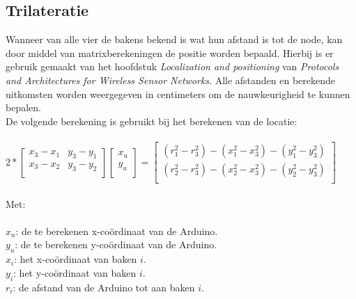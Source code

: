 \documentclass{article}
\begin{document}
\subsection{Trilateratie}
Wanneer van alle vier de bakens bekend is wat hun afstand is tot de node, kan door middel van matrixberekeningen de positie worden bepaald. Hierbij is er gebruik gemaakt van het hoofdstuk \textit{Localization and positioning} van \textit{Protocols and Architectures for Wireless Sensor Networks}\cite{h9}. Alle afstanden en berekende uitkomsten worden weergegeven in centimeters om de nauwkeurigheid te kunnen bepalen. \\
De volgende berekening is gebruikt bij het berekenen van de locatie: \\
\\
\indent$2*\begin{bmatrix}
       x_3 - x_1 & y_3 - y_1 \\
       x_3 - x_2 & y_3 - y_2 \\          
                
     \end{bmatrix}
     \begin{bmatrix}
       x_u \\          
       y_u \\         
     \end{bmatrix}
=\begin{bmatrix}
       (r_1^2 - r_3^2) - (x_1^2 - x_3^2) - (y_1^2 - y_3^2) \\
       (r_2^2 - r_3^2) - (x_2^2 - x_3^2) - (y_2^2 - y_3^2) \\
     \end{bmatrix}$ \\
 \\
Met: \\
\\
\indent$x_u$: de te berekenen x-co\"{o}rdinaat van de Arduino.\\
\indent$y_u$: de te berekenen y-co\"{o}rdinaat van de Arduino.\\
\indent$x_i$: het x-co\"{o}rdinaat van baken $i$.\\
\indent$y_i$: het y-co\"{o}rdinaat van baken $i$.\\
\indent$r_i$: de afstand van de Arduino tot aan baken $i$.
\end{document}
